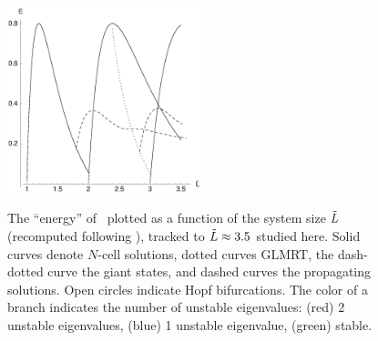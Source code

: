 \begin{figure}[t]
{\centering
\includegraphics[width=0.5\textwidth]{figs/ksBifDiag.eps}
}
\caption{
    {\small
The ``energy''   of \eqva\
plotted as a function of the system size
$\tilde{L}$ (recomputed following ), tracked to
$\tilde{L} \approx 3.5$ studied here.
Solid curves denote $N$-cell solutions,
dotted curves GLMRT, the dash-dotted curve the
giant states, and dashed curves the propagating solutions.
Open circles indicate Hopf bifurcations. 
The color of a branch indicates the number of unstable
eigenvalues: (red) 2 unstable eigenvalues, (blue) 1
unstable eigenvalue, (green) stable. 
    } %
        }
\label{fig:ksBifDiag}
\end{figure}

